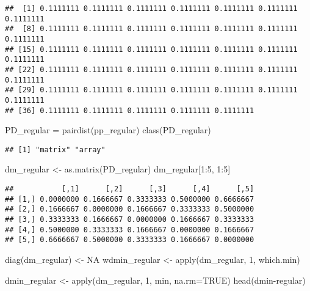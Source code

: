 \documentclass[
]{book}
\newenvironment{Shaded}{\begin{snugshade}}{\end{snugshade}}
\newcommand{\AttributeTok}[1]{\textcolor[rgb]{0.77,0.63,0.00}{#1}}
\newcommand{\ConstantTok}[1]{\textcolor[rgb]{0.00,0.00,0.00}{#1}}
\newcommand{\DecValTok}[1]{\textcolor[rgb]{0.00,0.00,0.81}{#1}}
\newcommand{\FunctionTok}[1]{\textcolor[rgb]{0.00,0.00,0.00}{#1}}
\newcommand{\NormalTok}[1]{#1}
\newcommand{\OtherTok}[1]{\textcolor[rgb]{0.56,0.35,0.01}{#1}}
\newcommand{\SpecialCharTok}[1]{\textcolor[rgb]{0.00,0.00,0.00}{#1}}
\begin{document}
\begin{verbatim}
##  [1] 0.1111111 0.1111111 0.1111111 0.1111111 0.1111111 0.1111111 0.1111111
##  [8] 0.1111111 0.1111111 0.1111111 0.1111111 0.1111111 0.1111111 0.1111111
## [15] 0.1111111 0.1111111 0.1111111 0.1111111 0.1111111 0.1111111 0.1111111
## [22] 0.1111111 0.1111111 0.1111111 0.1111111 0.1111111 0.1111111 0.1111111
## [29] 0.1111111 0.1111111 0.1111111 0.1111111 0.1111111 0.1111111 0.1111111
## [36] 0.1111111 0.1111111 0.1111111 0.1111111 0.1111111
\end{verbatim}

\begin{Shaded}
\begin{Highlighting}[]
\NormalTok{PD\_regular }\OtherTok{=} \FunctionTok{pairdist}\NormalTok{(pp\_regular)}
\FunctionTok{class}\NormalTok{(PD\_regular)}
\end{Highlighting}
\end{Shaded}

\begin{verbatim}
## [1] "matrix" "array"
\end{verbatim}

\begin{Shaded}
\begin{Highlighting}[]
\NormalTok{dm\_regular }\OtherTok{\textless{}{-}} \FunctionTok{as.matrix}\NormalTok{(PD\_regular)}
\NormalTok{dm\_regular[}\DecValTok{1}\SpecialCharTok{:}\DecValTok{5}\NormalTok{, }\DecValTok{1}\SpecialCharTok{:}\DecValTok{5}\NormalTok{]}
\end{Highlighting}
\end{Shaded}

\begin{verbatim}
##           [,1]      [,2]      [,3]      [,4]      [,5]
## [1,] 0.0000000 0.1666667 0.3333333 0.5000000 0.6666667
## [2,] 0.1666667 0.0000000 0.1666667 0.3333333 0.5000000
## [3,] 0.3333333 0.1666667 0.0000000 0.1666667 0.3333333
## [4,] 0.5000000 0.3333333 0.1666667 0.0000000 0.1666667
## [5,] 0.6666667 0.5000000 0.3333333 0.1666667 0.0000000
\end{verbatim}

\begin{Shaded}
\begin{Highlighting}[]
\FunctionTok{diag}\NormalTok{(dm\_regular) }\OtherTok{\textless{}{-}} \ConstantTok{NA}
\NormalTok{wdmin\_regular }\OtherTok{\textless{}{-}} \FunctionTok{apply}\NormalTok{(dm\_regular, }\DecValTok{1}\NormalTok{, which.min)}

\NormalTok{dmin\_regular }\OtherTok{\textless{}{-}} \FunctionTok{apply}\NormalTok{(dm\_regular, }\DecValTok{1}\NormalTok{, min, }\AttributeTok{na.rm=}\ConstantTok{TRUE}\NormalTok{)}
\FunctionTok{head}\NormalTok{(dmin}\SpecialCharTok{{-}}\NormalTok{regular)}
\end{Highlighting}
\end{Shaded}
\end{document}
